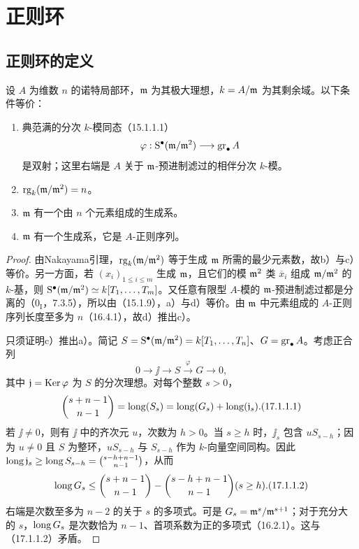 \section{正则环}
\subsection{正则环的定义}

设 $A$ 为维数 $n$ 的诺特局部环，$\mathfrak m$ 为其极大理想，$k=A/\mathfrak m$ 为其剩余域。以下条件等价：
\begin{enumerate}[label=\alph*)]
 \item 典范满的分次 $k$-模同态（15.1.1.1）
 \[
  \varphi:\mathrm S^\bullet(\mathfrak m/\mathfrak m^2)\longrightarrow\operatorname{gr}_\bullet A
 \]
 是双射；这里右端是 $A$ 关于 $\mathfrak m$-预进制滤过的相伴分次 $k$-模。
 \item $\operatorname{rg}_k(\mathfrak m/\mathfrak m^2)=n$。
 \item $\mathfrak m$ 有一个由 $n$ 个元素组成的生成系。
 \item $\mathfrak m$ 有一个生成系，它是 $A$-正则序列。
\end{enumerate}
\begin{proof}
由Nakayama引理，$\operatorname{rg}_k(\mathfrak m/\mathfrak m^2)$ 等于生成 $\mathfrak m$ 所需的最少元素数，故b）与c）等价。另一方面，若 $(x_i)_{1\leq i\leq m}$ 生成 $\mathfrak m$，且它们的模 $\mathfrak m^2$ 类 $\overline x_i$ 组成 $\mathfrak m/\mathfrak m^2$ 的 $k$-基，则
$\mathrm S^\bullet(\mathfrak m/\mathfrak m^2)\simeq k[T_1,\ldots,T_m]$。又任意有限型 $A$-模的 $\mathfrak m$-预进制滤过都是分离的（$0_{\mathrm I}$，7.3.5），所以由（15.1.9），a）与d）等价。由 $\mathfrak m$ 中元素组成的 $A$-正则序列长度至多为 $n$（16.4.1），故d）推出c）。

只须证明c）推出a）。简记
$S=\mathrm S^\bullet(\mathfrak m/\mathfrak m^2)=k[T_1,\ldots,T_n]$、$G=\operatorname{gr}_\bullet A$。考虑正合列
\[
 0\longrightarrow\jj\longrightarrow S\xrightarrow{\varphi}G\longrightarrow0,
\]
其中 $\mathfrak j=\operatorname{Ker}\varphi$ 为 $S$ 的分次理想。对每个整数 $s>0$，
\begin{equation}
 \binom{s+n-1}{n-1}=\len(S_s)=\len(G_s)+\len(\jj_s).
 \tag{17.1.1.1}
\end{equation}
若 $\jj\ne0$，则有 $\jj$ 中的齐次元 $u$，次数为 $h>0$。当 $s\geq h$ 时，$\jj_s$ 包含 $uS_{s-h}$；因为 $u\ne0$ 且 $S$ 为整环，$uS_{s-h}$ 与 $S_{s-h}$ 作为 $k$-向量空间同构。因此
$\operatorname{long}\mathfrak j_s\geq\operatorname{long} S_{s-h}=\binom{s-h+n-1}{n-1}$，从而
\begin{equation}
 \len G_s\leq\binom{s+n-1}{n-1}-\binom{s-h+n-1}{n-1}
 \qquad(s\geq h).
 \tag{17.1.1.2}
\end{equation}
右端是次数至多为 $n-2$ 的关于 $s$ 的多项式。可是
$G_s=\mathfrak m^s/\mathfrak m^{s+1}$；对于充分大的 $s$，$\operatorname{long} G_s$ 是次数恰为 $n-1$、首项系数为正的多项式（16.2.1）。这与（17.1.1.2）矛盾。
\end{proof}

